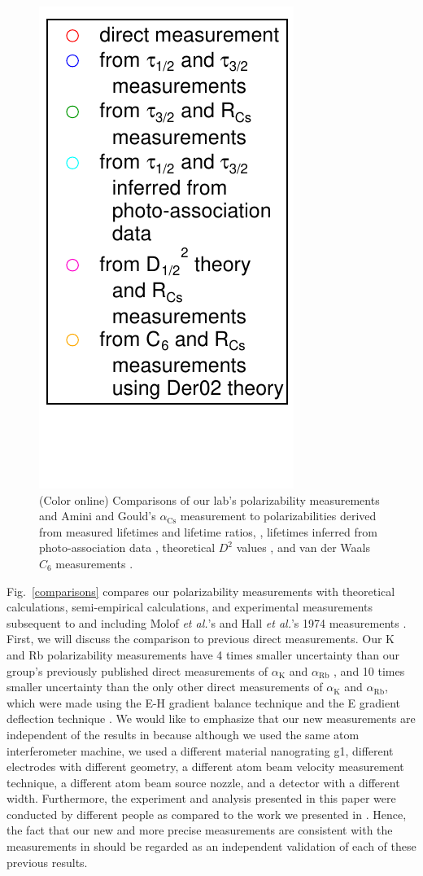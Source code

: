\documentclass[twocolumn,prl,showpacs,superscriptaddress,longbibliography]{revtex4-1}   %
\newcommand{\figref}[1]{Fig.~\ref{#1}}
\newcommand{\ak}{\alpha_{\textrm{K}}}
\newcommand{\arb}{\alpha_{\textrm{Rb}}}
\newcommand{\acs}{\alpha_{\textrm{Cs}}}
\newcommand{\etal}{\textit{et al.}}
\begin{document}
\begin{figure}
\includegraphics[width=0.365\linewidth,keepaspectratio,valign=t]{displayMiscLegend.pdf}
\caption{\label{comparisonsMisc}(Color online) Comparisons of our lab's polarizability measurements and Amini and Gould's $\acs$ measurement \cite{Amini2003} to polarizabilities derived from measured lifetimes and lifetime ratios,
\cite{Young1994,Rafac1999,Bouloufa2007,Falke2006a,Volz2006,Simsarian1998,Wang1997,Rafac1998}, 
lifetimes inferred from photo-association data
\cite{Gabbanini2000,Gutterres2002},
theoretical $D^2$ values
\cite{Porsev2010},
and van der Waals $C_6$ measurements
\cite{Leo2000,Chin2004,Derevianko2001}.}
\end{figure}

\figref{comparisons} compares our polarizability measurements with theoretical calculations, semi-empirical calculations, and experimental measurements subsequent to and including Molof \etal's and Hall \etal's 1974 measurements \cite{Molof1974a,Hall1974}.  First, we will discuss the comparison to previous direct measurements.   Our K and Rb polarizability measurements have 4 times smaller uncertainty than our group's previously published direct measurements of $\ak$ and $\arb$ \cite{Holmgren2010}, and 10 times smaller uncertainty than the only other direct measurements of $\ak$ and $\arb$, which were made using the E-H gradient balance technique \cite{Molof1974a} and the E gradient deflection technique  \cite{Hall1974}.  We would like to emphasize that our new measurements are independent of the results in \cite{Holmgren2010} because although we used the same atom interferometer machine, we used a different material nanograting g1, different electrodes with different geometry, a different atom beam velocity measurement technique, a different atom beam source nozzle, and a detector with a different width. Furthermore, the experiment and analysis presented in this paper were conducted by different people as compared to the work we presented in \cite{Holmgren2010}.  Hence, the fact that our new and more precise measurements are consistent with the measurements in \cite{Holmgren2010,Molof1974a,Hall1974} should be regarded as an independent validation of each of these previous results.
\end{document}

